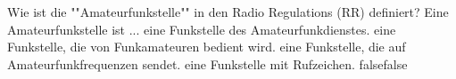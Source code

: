     {Wie ist die ""Amateurfunkstelle"" in den Radio Regulations (RR) definiert? Eine Amateurfunkstelle ist ...}
    {eine Funkstelle des Amateurfunkdienstes.}
    {eine Funkstelle, die von Funkamateuren bedient wird.}
    {eine Funkstelle, die auf Amateurfunkfrequenzen sendet.}
    {eine Funkstelle mit Rufzeichen.}
    {false}{false}